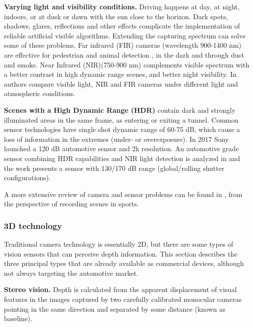 \documentclass[journal]{IEEEtran}
\begin{document}
\textbf{Varying light and visibility conditions.} Driving happens at day, 
at night, indoors, or at dusk or dawn with the sun close to the horizon. 
Dark spots, shadows, glares, reflections and other effects complicate the
implementation of reliable artificial visible algorithms.
Extending the capturing spectrum can solve some of these problems. 
Far infrared (FIR) cameras (wavelength 900-1400 nm) 
are effective for pedestrian and animal detection
\cite{OMalley2008, Besbes2015}, in the dark and through dust and smoke.
Near Infrared (NIR)(750-900 nm) complements visible spectrum with a better
contrast in high dynamic range scenes, and better night visibility. 
In \cite{Pinchon2018} authors compare visible light, NIR and FIR cameras 
under different light and atmospheric conditions.

\textbf{Scenes with a High Dynamic Range (HDR)} contain dark and strongly
illuminated areas in the same frame, as entering or exiting a tunnel.
Common sensor technologies have single shot dynamic range of 60-75 dB,
which cause a loss of information in the extremes (under- or overexposure).
In 2017 Sony launched a 120 dB automotive sensor and 2k resolution.
An automotive grade sensor combining HDR capabilities and NIR
light detection is analyzed in \cite{Maddalena2005} and the work 
\cite{Strobel2013} presents a sensor with 130/170 dB range (global/rolling 
shutter configurations).

A more extensive review of camera and sensor problems can be found in  
\cite{Pueo2016}, from the perspective of recording scenes in sports.

\subsubsection{3D technology}
Traditional camera technology is essentially 2D, but there are some
types of vision sensors that can perceive depth information. This section
describes the three principal types that are already available as commercial
devices, although not always targeting the automotive market.

\textbf{Stereo vision.} Depth is calculated \cite{Hamzah2016} from the 
apparent displacement of visual features in the images captured by two 
carefully calibrated monocular cameras pointing in the same direction and
separated by some distance (known as baseline). 
\end{document}
